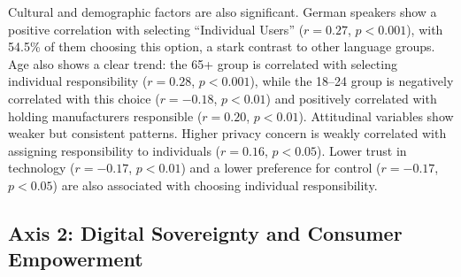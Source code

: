 		Cultural and demographic factors are also significant. German speakers show a positive correlation with selecting ``Individual Users'' ($r = 0.27$, $p < 0.001$), with 54.5\% of them choosing this option, a stark contrast to other language groups. Age also shows a clear trend: the 65+ group is correlated with selecting individual responsibility ($r = 0.28$, $p < 0.001$), while the 18--24 group is negatively correlated with this choice ($r = -0.18$, $p < 0.01$) and positively correlated with holding manufacturers responsible ($r = 0.20$, $p < 0.01$).
		Attitudinal variables show weaker but consistent patterns. Higher privacy concern is weakly correlated with assigning responsibility to individuals ($r = 0.16$, $p < 0.05$). Lower trust in technology ($r = -0.17$, $p < 0.01$) and a lower preference for control ($r = -0.17$, $p < 0.05$) are also associated with choosing individual responsibility.
\subsection{Axis 2: Digital Sovereignty and Consumer Empowerment}
